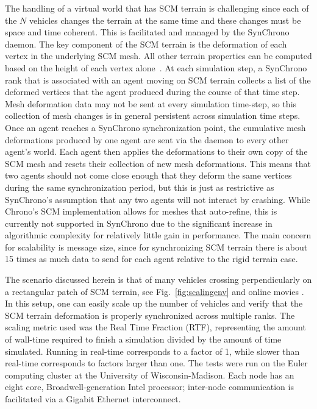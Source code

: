 \documentclass[12pt,twocolumn]{article}
\begin{document}
The handling of a virtual world that has SCM terrain is challenging since each of the $N$ vehicles changes the terrain at the same time and these changes must be space and time coherent. This is facilitated and managed by the SynChrono daemon. The key component of the SCM terrain is the deformation of each vertex in the underlying SCM mesh. All other terrain properties can be computed based on the height of each vertex alone~\cite{ChronoSCM2019}. At each simulation step, a SynChrono rank that is associated with an agent moving on SCM terrain collects a list of the deformed vertices that the agent produced during the course of that time step. Mesh deformation data may not be sent at every simulation time-step, so this collection of mesh changes is in general persistent across simulation time steps. Once an agent reaches a SynChrono synchronization point, the cumulative mesh deformations produced by one agent are sent via the daemon to every other agent's world. Each agent then applies the deformations to their own copy of the SCM mesh and resets their collection of new mesh deformations. This means that two agents should not come close enough that they deform the same vertices during the same synchronization period, but this is just as restrictive as SynChrono's assumption that any two agents will not interact by crashing. While Chrono's SCM implementation allows for meshes that auto-refine, this is currently not supported in SynChrono due to the significant increase in algorithmic complexity for relatively little gain in performance. The main concern for scalability is message size, since for synchronizing SCM terrain there is about 15 times as much data to send for each agent relative to the rigid terrain case. 

The scenario discussed herein is that of many vehicles crossing perpendicularly on a rectangular patch of SCM terrain, see Fig.~\ref{fig:scalingenv} and online movies \cite{simsPaperGVSETS2020}. In this setup, one can easily scale up the number of vehicles and verify that the SCM terrain deformation is properly synchronized across multiple ranks. The scaling metric used was the Real Time Fraction (RTF), representing the amount of wall-time required to finish a simulation divided by the amount of time simulated. Running in real-time corresponds to a factor of 1, while slower than real-time corresponds to factors larger than one. The tests were run on the Euler computing cluster at the University of Wisconsin-Madison. Each node has an eight core, Broadwell-generation Intel processor; inter-node communication is facilitated via a Gigabit Ethernet interconnect. 
\end{document}
